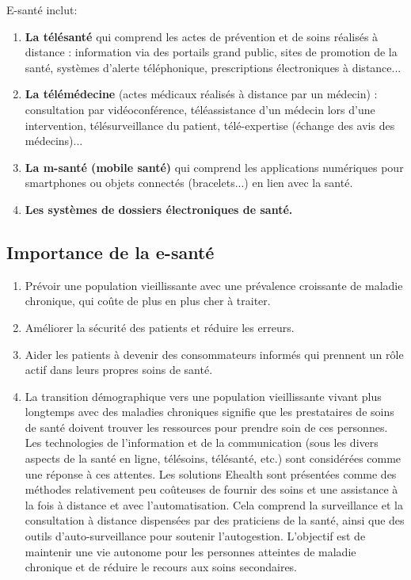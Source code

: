 \documentclass[12pt]{article}
\begin{document}
E-santé inclut:
\begin{enumerate}
	\item \textbf{La télésanté} qui comprend les actes de prévention et de soins réalisés à distance : information via des portails grand public, sites de promotion de la santé, systèmes d'alerte téléphonique, prescriptions électroniques à distance...
	\item \textbf{La télémédecine} (actes médicaux réalisés à distance par un médecin) : consultation par vidéoconférence, téléassistance d'un médecin lors d'une intervention, télésurveillance du patient, télé-expertise (échange des avis des médecins)...
	\item \textbf{La m-santé (mobile santé)} qui comprend les applications numériques pour smartphones ou objets connectés (bracelets...) en lien avec la santé.
	\item \textbf{Les systèmes de dossiers électroniques de santé.}
\end{enumerate}

\subsection{Importance de la e-santé}
\begin{enumerate}
	\item Prévoir une population vieillissante avec une prévalence croissante de maladie chronique, qui coûte de plus en plus cher à traiter.
	\item Améliorer la sécurité des patients et réduire les erreurs.
	\item Aider les patients à devenir des consommateurs informés qui prennent un rôle actif dans leurs propres soins de santé.
	\item La transition démographique vers une population vieillissante vivant plus longtemps avec des maladies chroniques signifie que les prestataires de soins de santé doivent trouver les ressources pour prendre soin de ces personnes. Les technologies de l’information et de la communication (sous les divers aspects de la santé en ligne, télésoins, télésanté, etc.) sont considérées comme une réponse à ces attentes. Les solutions Ehealth sont présentées comme des méthodes relativement peu coûteuses de fournir des soins et une assistance à la fois à distance et avec l’automatisation. Cela comprend la surveillance et la consultation à distance dispensées par des praticiens de la santé, ainsi que des outils d'auto-surveillance pour soutenir l'autogestion. L’objectif est de maintenir une vie autonome pour les personnes atteintes de maladie chronique et de réduire le recours aux soins secondaires.
\end{enumerate}
\end{document}
